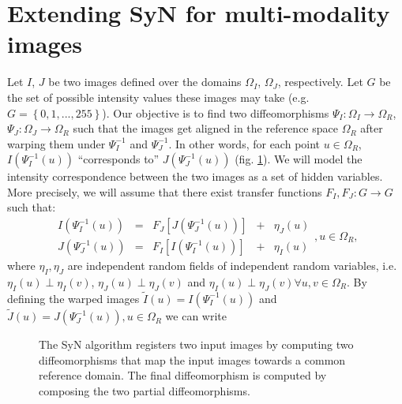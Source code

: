 \documentclass[11pt]{article}
\begin{document}
\section{Extending SyN for multi-modality images}

Let $I$, $J$ be two images defined over the domains $\Omega_{I}$, $\Omega_{J}$, respectively. Let $G$ be the set of
possible intensity values these images may take (e.g. $G=\left\lbrace 0,1,...,255\right\rbrace$). Our objective is to find two diffeomorphisms
$\Psi_{I}:\Omega_{I}\rightarrow \Omega_{R}$, $\Psi_{J}:\Omega_{J}\rightarrow \Omega_{R}$ such that the images get aligned in the reference space $\Omega_{R}$
after warping them under $\Psi_{I}^{-1}$ and $\Psi_{J}^{-1}$. In other words, for each point $u \in \Omega_{R}$, $I(\Psi_{I}^{-1}(u))$ ``corresponds to'' $J(\Psi_{J}^{-1}(u))$
(fig. \ref{fig:syn_overview}). We will model the intensity correspondence between the two images as a set of hidden variables. More precisely, we will assume that there exist transfer functions
$F_{I}, F_{J}:G \rightarrow G$ such that:\\
\begin{equation}\label{eq:SyNEM_gom_ref}
    \begin{array}{ccccc}
        I(\Psi_{I}^{-1}(u)) &=& F_{J}[J(\Psi_{J}^{-1}(u))] &+& \eta_{J}(u)\\
        J(\Psi_{J}^{-1}(u)) &=& F_{I}[I(\Psi_{I}^{-1}(u))] &+& \eta_{I}(u)
    \end{array}, u\in\Omega_{R},
\end{equation}
where $\eta_{I}, \eta_{J}$ are independent random fields of independent random variables, i.e. $\eta_{I}(u) \perp \eta_{I}(v)$,
$\eta_{J}(u) \perp \eta_{J}(v)$ and $\eta_{I}(u) \perp \eta_{J}(v) \forall u,v\in \Omega_{R}$. By defining the warped images $\tilde{I}(u) = I(\Psi_{I}^{-1}(u))$
and $\tilde{J}(u) = J(\Psi_{J}^{-1}(u)), u \in \Omega_{R}$ we can write

\begin{figure}[H]
\centering
{}
\caption{The SyN algorithm registers two input images by computing two diffeomorphisms that map the input images towards a common reference domain. The final
diffeomorphism is computed by composing the two partial diffeomorphisms.}
\label{fig:syn_overview}
\end{figure}
\end{document}
